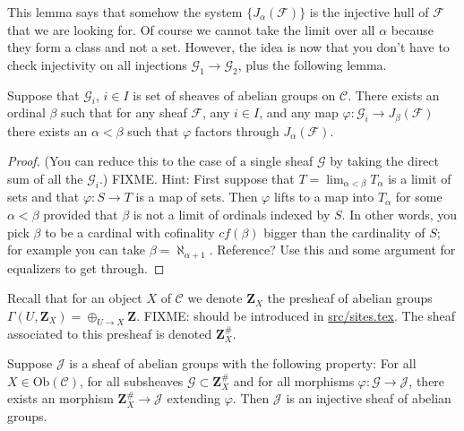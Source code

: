 \noindent
This lemma says that somehow the system $\{J_{\alpha}(\mathcal{F})\}$
is the injective hull of $\mathcal{F}$ that we are looking for. Of course
we cannot take the limit over all $\alpha$ because they form a class
and not a set. However, the idea is now that you don't have to check
injectivity on all injections $\mathcal{G}_1 \to \mathcal{G}_2$, plus
the following lemma.

\begin{lemma}
\label{lemma-map-into-smaller}
Suppose that $\mathcal{G}_i$, $i\in I$ is set of sheaves of abelian 
groups on $\mathcal{C}$. There exists an ordinal $\beta$ such that
for any sheaf $\mathcal{F}$, any $i\in I$, and any map $\varphi : 
\mathcal{G}_i \to J_\beta(\mathcal{F})$ there exists an 
$\alpha < \beta$ such that $ \varphi $ factors through 
$J_\alpha(\mathcal{F})$.
\end{lemma}

\begin{proof}
(You can reduce this to the case of a single sheaf $\mathcal{G}$
by taking the direct sum of all the $\mathcal{G}_i$.)
FIXME. Hint: First suppose that $T = \lim_{\alpha < \beta} T_\alpha$
is a limit of sets and that $\varphi : S \to T$ is a map of sets. 
Then $\varphi$ lifts to a map into $T_\alpha$ for some $\alpha < \beta$
provided that $\beta$ is not a limit of ordinals indexed by $S$.
In other words, you pick $\beta$ to be a cardinal with cofinality
$cf(\beta)$ bigger than the cardinality of $S$; for example you can take 
$\beta = \aleph_{\alpha+1}$. Reference? Use this and
some argument for equalizers to get through.
\end{proof}

\noindent
Recall that for an object $X$ of $\mathcal{C}$ we denote $\mathbf{Z}_X$ 
the presheaf of abelian groups $\Gamma(U, \mathbf{Z}_X) = 
\oplus_{U \to X} \mathbf{Z}$. FIXME: should be introduced in
\url{src/sites.tex}. The sheaf associated to this presheaf
is denoted $\mathbf{Z}_X^\#$.

\begin{lemma}
\label{lemma-characterize-injectives}
Suppose $\mathcal{J}$ is a sheaf of abelian groups with the following
property: For all $X\in \text{Ob}(\mathcal{C})$, for all subsheaves
$\mathcal{G} \subset \mathbf{Z}_X^\#$ and for all morphisms
$\varphi : \mathcal{G} \to \mathcal{J}$, there exists an morphism
$\mathbf{Z}_X^\# \to \mathcal{J}$ extending $\varphi$.
Then $\mathcal{J}$ is an injective sheaf of abelian groups.
\end{lemma}


